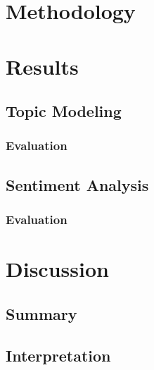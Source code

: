 \documentclass[12pt,english,titlepage,a4paper]{article}
\begin{document}

\tableofcontents
\pagebreak





\section{Methodology}






\section{Results}
\subsection{Topic Modeling}
\subsubsection{Evaluation}
\subsection{Sentiment Analysis}
\subsubsection{Evaluation}


\section{Discussion}
\subsection{Summary}
\subsection{Interpretation}
\end{document}
